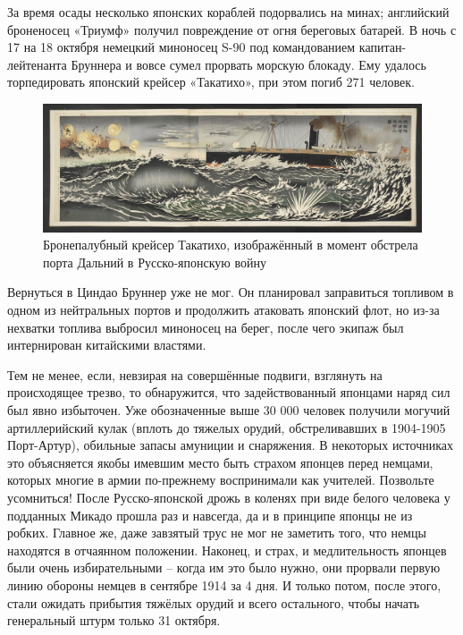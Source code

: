 За время осады несколько японских кораблей подорвались на минах; английский броненосец «Триумф» получил повреждение от огня береговых батарей. В ночь с 17 на 18 октября немецкий миноносец S-90 под командованием капитан-лейтенанта Бруннера и вовсе сумел прорвать морскую блокаду. Ему удалось торпедировать японский крейсер «Такатихо», при этом погиб 271 человек. 

\begin{figure}[h!tb] 
	\centering\includegraphics[scale=0.15]{Glava3/SYUEA0WTbBs.jpg}
	\caption{Бронепалубный крейсер Такатихо, изображённый в момент обстрела порта Дальний в Русско-японскую войну}%
\end{figure}

Вернуться в Циндао Бруннер уже не мог. Он планировал заправиться топливом в одном из нейтральных портов и продолжить атаковать японский флот, но из-за нехватки топлива выбросил миноносец на берег, после чего экипаж был интернирован китайскими властями.

Тем не менее, если, невзирая на совершённые подвиги, взглянуть на происходящее трезво, то обнаружится, что задействованный японцами наряд сил был явно избыточен. Уже обозначенные выше 30 000 человек получили могучий артиллерийский кулак (вплоть до тяжелых орудий, обстреливавших в 1904-1905 Порт-Артур), обильные запасы амуниции и снаряжения. В некоторых источниках это объясняется якобы имевшим место быть страхом японцев перед немцами, которых многие в армии по-прежнему воспринимали как учителей. Позвольте усомниться! После Русско-японской дрожь в коленях при виде белого человека у подданных Микадо прошла раз и навсегда, да и в принципе японцы не из робких. Главное же, даже завзятый трус не мог не заметить того, что немцы находятся в отчаянном положении. Наконец, и страх, и медлительность японцев были очень избирательными – когда им это было нужно, они прорвали первую линию обороны немцев в сентябре 1914 за 4 дня. И только потом, после этого, стали ожидать прибытия тяжёлых орудий и всего остального, чтобы начать генеральный штурм только 31 октября.

